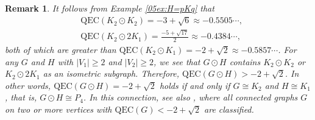 \documentclass[12pt,a4paper]{article}
\newtheorem{remark}[theorem]{Remark}
\newcommand{\1}{{\bm 1}}
\numberwithin{equation}{section}
\begin{document}
\begin{remark}\normalfont
It follows from Example \ref{05ex:H=pKq} that
\begin{align*}
&\mathrm{QEC}(K_2\odot K_2)=-3+\sqrt6\approx -0.5505\cdots,
\\
&\mathrm{QEC}(K_2\odot 2K_1)=\frac{-5+\sqrt{17}}{2}
\approx -0.4384\cdots,
\end{align*}
both of which are greater than $\mathrm{QEC}(K_2\odot K_1)
=-2+\sqrt2\approx -0.5857\cdots$.
For any $G$ and $H$ with $|V_1|\ge2$ and $|V_2|\ge2$,
we see that $G\odot H$ contains $K_2\odot K_2$ or $K_2\odot 2K_1$ as
an isometric subgraph.
Therefore, $\mathrm{QEC}(G\odot H)>-2+\sqrt{2}$.
In other words, $\mathrm{QEC}(G\odot H)= -2+\sqrt{2}$ holds
if and only if $G\cong K_2$ and $H\cong K_1$,
that is, $G\odot H \cong P_4$.
In this connection, see also \cite{Baskoro-Obata2021},
where all connected graphs $G$ on two or more vertices
with $\mathrm{QEC}(G)<-2+\sqrt2$ are classified.
\end{remark}
\end{document}
